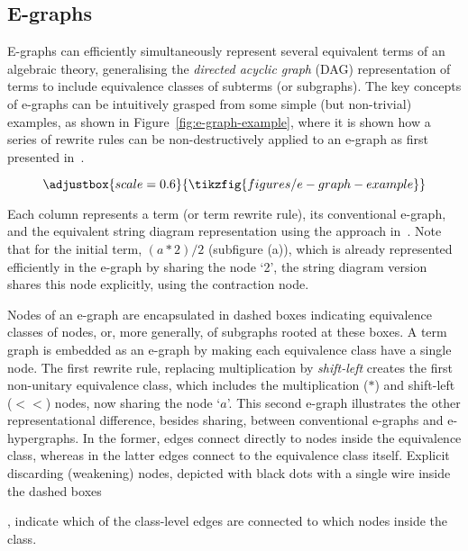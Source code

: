 \documentclass[]{IEEEtran}
\begin{document}
\subsection{E-graphs}

E-graphs can efficiently simultaneously represent several equivalent terms of an algebraic theory, generalising the \textit{directed acyclic graph} (DAG) representation of terms to include equivalence classes of subterms (or subgraphs).
The key concepts of e-graphs can be intuitively grasped from some simple (but non-trivial) examples, as shown in Figure~\ref{fig:e-graph-example}, where it is shown how a series of rewrite rules can be non-destructively applied to an e-graph as first presented in~\cite{EggPaper}.

\begin{figure*}[h!]
\[
\adjustbox{scale=0.6}{
\tikzfig{figures/e-graph-example}
}
\]
\caption{E-graph example (top) and its equivalent string diagram representation (bottom)}
\label{fig:e-graph-example}
\end{figure*}

Each column represents a term (or term rewrite rule), its conventional e-graph, and the equivalent string diagram representation using the approach in~\cite{ghica2024equivalencehypergraphsegraphsmonoidal}. 
Note that for the initial term, $(a*2)/2$ (subfigure (a)), which is already represented efficiently in the e-graph by sharing the node `2', the string diagram version shares this node explicitly, using the contraction node.

Nodes of an e-graph are encapsulated in dashed boxes indicating equivalence classes of nodes, or, more generally, of subgraphs rooted at these boxes.
A term graph is embedded as an e-graph by making each equivalence class have a single node.
The first rewrite rule, replacing multiplication by \emph{shift-left} creates the first non-unitary equivalence class, which includes the multiplication ($*$) and shift-left ($<\!\!<$) nodes,  now sharing the node `$a$'.
This second e-graph illustrates the other representational difference, besides sharing, between conventional e-graphs and e-hypergraphs.
In the former, edges connect directly to nodes inside the equivalence class, whereas in the latter edges connect to the equivalence class itself.
Explicit discarding (weakening) nodes, depicted with black dots with a single wire inside the dashed boxes 

, indicate which of the class-level edges are connected to which nodes inside the class.
\end{document}
